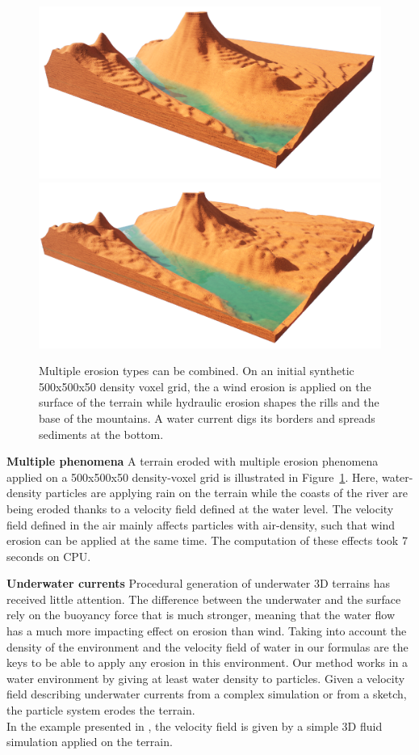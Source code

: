 \begin{figure}[b]
    \centering
    \includegraphics[width=0.49\linewidth]{Results/MultiEffects_base.png}
    \includegraphics[width=0.49\linewidth]{Results/MultiEffects.png}
    \caption{Multiple erosion types can be combined. On an initial synthetic 500x500x50 density voxel grid, the a wind erosion is applied on the surface of the terrain while hydraulic erosion shapes the rills and the base of the mountains. A water current digs its borders and spreads sediments at the bottom. }
    \label{Erosion-fig:multiErosions}
\end{figure}
\textbf{Multiple phenomena} A terrain eroded with multiple erosion phenomena applied on a 500x500x50 density-voxel grid is illustrated in Figure~\ref{Erosion-fig:multiErosions}. Here, water-density particles are applying rain on the terrain while the coasts of the river are being eroded thanks to a velocity field defined at the water level. The velocity field defined in the air mainly affects particles with air-density, such that wind erosion can be applied at the same time. The computation of these effects took 7 seconds on CPU.

\textbf{Underwater currents}
Procedural generation of underwater 3D terrains has received little attention. The difference between the underwater and the surface rely on the buoyancy force that is much stronger, meaning that the water flow has a much more impacting effect on erosion than wind. Taking into account the density of the environment and the velocity field of water in our formulas are the keys to be able to apply any erosion in this environment. 
Our method works in a water environment by giving at least water density to particles. Given a velocity field describing underwater currents from a complex simulation or from a sketch, the particle system erodes the terrain. \\ 
In the example presented in , the velocity field is given by a simple 3D fluid simulation \cite{Stam1999} applied on the terrain.

